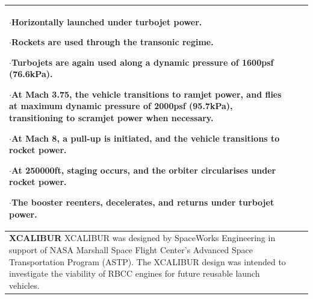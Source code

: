 {\begin{landscape}
\begin{xltabular}{\linewidth}{|X|X|X|}
	$\cdot$Horizontally launched under turbojet power.
	
	$\cdot$Rockets are used through the transonic regime.
	
	$\cdot$Turbojets are again used along a dynamic pressure of 1600psf (76.6kPa). 
	
	$\cdot$At Mach 3.75, the vehicle transitions to ramjet power, and flies at maximum dynamic pressure of 2000psf (95.7kPa), transitioning to scramjet power when necessary.
	
	$\cdot$At Mach 8, a pull-up is initiated, and the vehicle transitions to rocket power. 
	
	$\cdot$At 250000ft, staging occurs, and the orbiter circularises under rocket power. 
	
	$\cdot$The booster reenters, decelerates, and returns under turbojet power.  
	\\
	
	\hline \small 
	\textbf{XCALIBUR}\cite{Bradford2002}\newline\newline
	XCALIBUR was designed by SpaceWorks Engineering in support of NASA Marshall Space Flight Center’s Advanced Space Transportation Program (ASTP). The XCALIBUR design was intended to investigate the viability of RBCC engines for future reusable launch vehicles. 
	&\small
	

\end{xltabular}
\end{landscape}}
